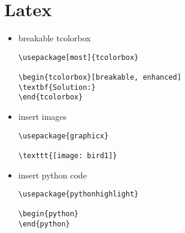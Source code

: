 \documentclass[twoside,12pt]{article}
\begin{document}
\section{Latex}
\begin{itemize}
\item breakable tcolorbox \\
\begin{lstlisting}
\usepackage[most]{tcolorbox}

\begin{tcolorbox}[breakable, enhanced]
\textbf{Solution:}
\end{tcolorbox}
\end{lstlisting}

\item insert images \\
\begin{lstlisting}
\usepackage{graphicx}

\texttt{[image: bird1]}
\end{lstlisting}


\item insert python code \\
\begin{lstlisting}
\usepackage{pythonhighlight}

\begin{python}
\end{python}

\end{lstlisting}


\end{itemize}
\end{document}

